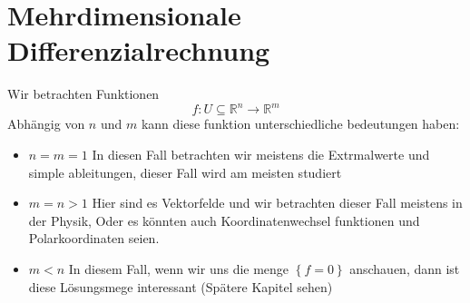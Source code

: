 \documentclass{article}
\begin{document}
\section*{Mehrdimensionale Differenzialrechnung}
Wir betrachten Funktionen \[f:U \subseteq \mathbb{R}^n \rightarrow \mathbb{R}^m\]
Abhängig von $n$ und $m$ kann diese funktion unterschiedliche bedeutungen haben:
\begin{itemize}
  \item[]{$n=m=1$ In diesen Fall betrachten wir meistens die Extrmalwerte und simple ableitungen, dieser Fall wird am meisten studiert}
  \item[]{$m=n>1$ Hier sind es Vektorfelde und wir betrachten dieser Fall meistens in der Physik, Oder es könnten auch Koordinatenwechsel funktionen und Polarkoordinaten seien.}
  \item[]{$m<n$ In diesem Fall, wenn wir uns die menge $\left\lbrace f=0\right\rbrace$ anschauen, dann ist diese Lösungsmege interessant (Spätere Kapitel sehen)}
\end{itemize}
\end{document}
